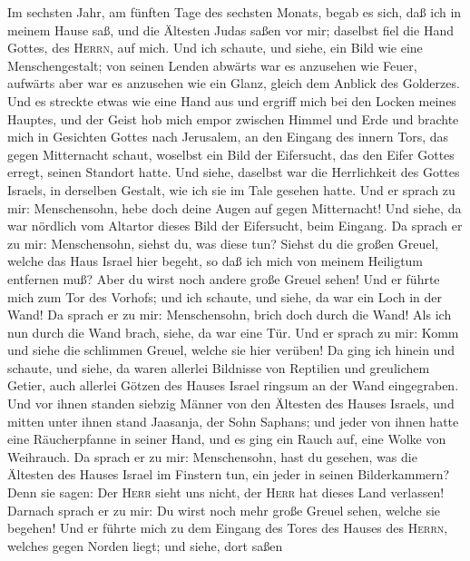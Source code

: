  Im sechsten Jahr, am fünften Tage des sechsten Monats,
begab es sich, daß ich in meinem Hause saß, und die Ältesten Judas saßen
vor mir; daselbst fiel die Hand Gottes, des \textsc{Herrn}, auf mich.
 Und ich schaute, und siehe, ein Bild wie eine
Menschengestalt; von seinen Lenden abwärts war es anzusehen wie Feuer,
aufwärts aber war es anzusehen wie ein Glanz, gleich dem Anblick des
Golderzes.  Und es streckte etwas wie eine Hand aus und
ergriff mich bei den Locken meines Hauptes, und der Geist hob mich empor
zwischen Himmel und Erde und brachte mich in Gesichten Gottes nach
Jerusalem, an den Eingang des innern Tors, das gegen Mitternacht schaut,
woselbst ein Bild der Eifersucht, das den Eifer Gottes erregt, seinen
Standort hatte.  Und siehe, daselbst war die Herrlichkeit
des Gottes Israels, in derselben Gestalt, wie ich sie im Tale gesehen
hatte.  Und er sprach zu mir: Menschensohn, hebe doch
deine Augen auf gegen Mitternacht! Und siehe, da war nördlich vom
Altartor dieses Bild der Eifersucht, beim Eingang.  Da
sprach er zu mir: Menschensohn, siehst du, was diese tun? Siehst du die
großen Greuel, welche das Haus Israel hier begeht, so daß ich mich von
meinem Heiligtum entfernen muß? Aber du wirst noch andere große Greuel
sehen!  Und er führte mich zum Tor des Vorhofs; und ich
schaute, und siehe, da war ein Loch in der Wand!  Da
sprach er zu mir: Menschensohn, brich doch durch die Wand! Als ich nun
durch die Wand brach, siehe, da war eine Tür.  Und er
sprach zu mir: Komm und siehe die schlimmen Greuel, welche sie hier
verüben!  Da ging ich hinein und schaute, und siehe, da
waren allerlei Bildnisse von Reptilien und greulichem Getier, auch
allerlei Götzen des Hauses Israel ringsum an der Wand eingegraben.
 Und vor ihnen standen siebzig Männer von den Ältesten
des Hauses Israels, und mitten unter ihnen stand Jaasanja, der Sohn
Saphans; und jeder von ihnen hatte eine Räucherpfanne in seiner Hand,
und es ging ein Rauch auf, eine Wolke von Weihrauch.  Da
sprach er zu mir: Menschensohn, hast du gesehen, was die Ältesten des
Hauses Israel im Finstern tun, ein jeder in seinen Bilderkammern? Denn
sie sagen: Der \textsc{Herr} sieht uns nicht, der \textsc{Herr} hat
dieses Land verlassen!  Darnach sprach er zu mir: Du
wirst noch mehr große Greuel sehen, welche sie begehen! 
Und er führte mich zu dem Eingang des Tores des Hauses des
\textsc{Herrn}, welches gegen Norden liegt; und siehe, dort saßen
